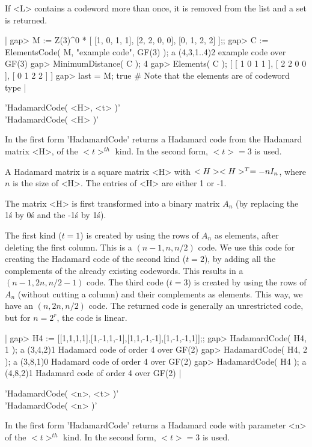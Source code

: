 If <L>  contains a codeword more than  once, it is  removed from the list
and a {\GAP} set is returned.

|    gap> M := Z(3)^0 * [ [1, 0, 1, 1], [2, 2, 0, 0], [0, 1, 2, 2] ];;
    gap> C := ElementsCode( M, "example code", GF(3) );
    a (4,3,1..4)2 example code over GF(3)
    gap> MinimumDistance( C );
    4
    gap> Elements( C );
    [ [ 1 0 1 1 ], [ 2 2 0 0 ], [ 0 1 2 2 ] ]
    gap> last = M;
    true    # Note that the elements are of codeword type |


'HadamardCode( <H>, <t> )'\\
'HadamardCode( <H> )'

In the   first form 'HadamardCode'  returns   a  Hadamard code  from  the
Hadamard matrix <H>, of the  $<t>^{th}$ kind. In the  second form, $<t> =
3$ is used.

A Hadamard  matrix is a  square  matrix <H>  with $<H>\*<H>^T = -n\*I_n$,
where $n$ is the size of <H>. The entries of <H> are either 1 or -1.

The matrix <H>  is first   transformed into a   binary  matrix $A_n$  (by
replacing the 1\'s by 0\'s and the -1\'s by 1\'s).

The first kind ($t=1$) is created by using the rows of $A_n$ as elements,
after deleting the first column. This is a $(n-1, n,  n/2)$ code.  We use
this code for creating the  Hadamard code of the  second kind ($t=2$), by
adding   all the  complements of   the already  existing  codewords. This
results in a $(n-1, 2n, n/2 -1)$ code.  The third code ($t=3$) is created
by  using   the  rows of $A_n$   (without  cutting  a  column)  and their
complements as elements.  This way, we have an  $(n, 2n, n/2)$ code.  The
returned code is generally  an unrestricted code,  but for $n = 2^r$, the
code is linear.

|    gap> H4 := [[1,1,1,1],[1,-1,1,-1],[1,1,-1,-1],[1,-1,-1,1]];;
    gap> HadamardCode( H4, 1 );
    a (3,4,2)1 Hadamard code of order 4 over GF(2)
    gap> HadamardCode( H4, 2 );
    a (3,8,1)0 Hadamard code of order 4 over GF(2)
    gap> HadamardCode( H4 );
    a (4,8,2)1 Hadamard code of order 4 over GF(2) |

'HadamardCode( <n>, <t> )'\\
'HadamardCode( <n> )'

In  the first form 'HadamardCode'  returns a Hadamard code with parameter
<n> of the $<t>^{th}$ kind. In the second form, $<t>=3$ is used.

